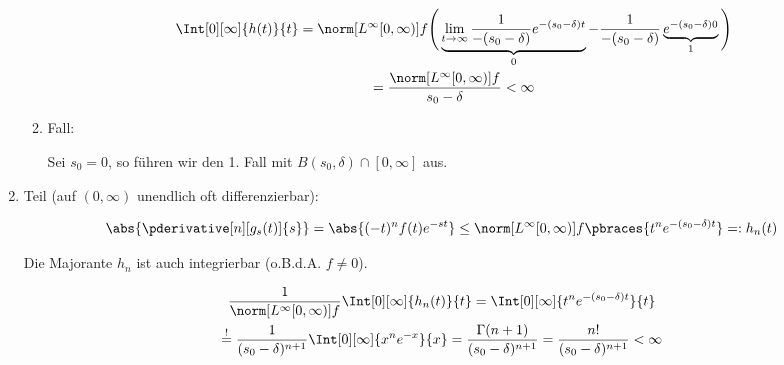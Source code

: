 \begin{solution}
\begin{enumerate}[label = \arabic*.]
\begin{enumerate}[label = \arabic*.]
        \begin{multline*}
            \Int[0][\infty]{h(t)}{t}
            =
            \norm[{L^\infty[0, \infty)}]{f}
            \Bigg (
                \underbrace
                {
                    \lim_{t \to \infty}
                    \frac{1}{-(s_0 - \delta)}
                    e^{-(s_0 - \delta) t}    
                }_0
                -
                \frac{1}{-(s_0 - \delta)}
                \underbrace
                {
                    e^{-(s_0 - \delta) 0}
                }_1
            \Bigg ) \\
            =
            \frac
            {
                \norm[{L^\infty[0, \infty)}]{f}
            }{
                s_0 - \delta
            }
            <
            \infty
        \end{multline*}

        \item Fall:
        
        Sei $s_0 = 0$, so führen wir den 1. Fall mit $B(s_0, \delta) \cap [0, \infty]$ aus.

    \end{enumerate}    

    \item Teil (auf $(0, \infty)$ unendlich oft differenzierbar):
    
    \begin{align*}
        \abs
        {
            \pderivative[n][g_s(t)]{s}
        }
        =
        \abs
        {
            (-t)^n f(t) e^{-s t}
        }
        \leq
        \norm[{L^\infty[0, \infty)}]{f}
        \pbraces
        {
            t^n e^{-(s_0 - \delta) t}
        }
        =:
        h_n(t)
    \end{align*}

    Die Majorante $h_n$ ist auch integrierbar (o.B.d.A. $f \neq 0$).

    \begin{multline*}
        \frac{1}
        {
            \norm[{L^\infty[0, \infty)}]{f}
        }
        \Int[0][\infty]{h_n(t)}{t}
        =
        \Int[0][\infty]{t^n e^{-(s_0 - \delta) t}}{t} \\
        \stackrel{!}{=}
        \frac{1}{(s_0 - \delta)^{n+1}}
        \Int[0][\infty]{x^n e^{-x}}{x}
        =
        \frac
        {
            \Gamma(n+1)
        }{
            (s_0 - \delta)^{n+1}
        }
        =
        \frac{n!}{(s_0 - \delta)^{n+1}}
        <
        \infty
    \end{multline*}


\end{enumerate}
\end{solution}
